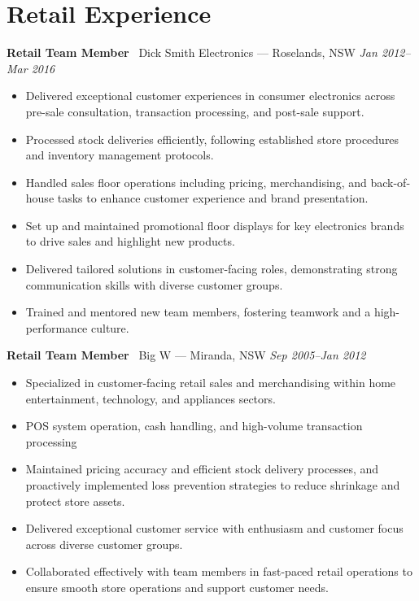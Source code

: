 \documentclass[a4paper,10pt]{article}
\begin{document}
\section*{Retail Experience}
\textbf{Retail Team Member} \textbar\ Dick Smith Electronics --- Roselands, NSW \hfill \textit{Jan 2012--Mar 2016}
\begin{itemize}[nosep,leftmargin=*,topsep=0pt,partopsep=0pt,itemsep=3pt]
\item Delivered exceptional customer experiences in consumer electronics across pre-sale consultation, transaction processing, and post-sale support.
\item Processed stock deliveries efficiently, following established store procedures and inventory management protocols.
\item Handled sales floor operations including pricing, merchandising, and back-of-house tasks to enhance customer experience and brand presentation.
\item Set up and maintained promotional floor displays for key electronics brands to drive sales and highlight new products.
\item Delivered tailored solutions in customer-facing roles, demonstrating strong communication skills with diverse customer groups.
\item Trained and mentored new team members, fostering teamwork and a high-performance culture.
\end{itemize}\vspace{0.4em}
\vspace{0.4em}
\textbf{Retail Team Member} \textbar\ Big W --- Miranda, NSW \hfill \textit{Sep 2005--Jan 2012}
\begin{itemize}[nosep,leftmargin=*,topsep=0pt,partopsep=0pt,itemsep=3pt]
\item Specialized in customer-facing retail sales and merchandising within home entertainment, technology, and appliances sectors.
\item POS system operation, cash handling, and high-volume transaction processing
\item Maintained pricing accuracy and efficient stock delivery processes, and proactively implemented loss prevention strategies to reduce shrinkage and protect store assets.
\item Delivered exceptional customer service with enthusiasm and customer focus across diverse customer groups.
\item Collaborated effectively with team members in fast-paced retail operations to ensure smooth store operations and support customer needs.
\end{itemize}
\vspace{0.4em}
\end{document}
